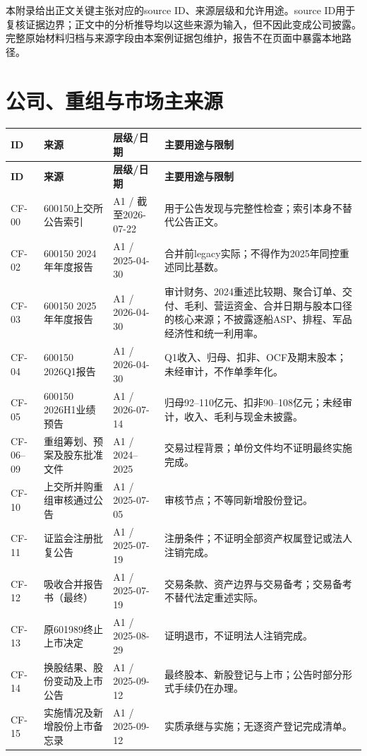 本附录给出正文关键主张对应的source ID、来源层级和允许用途。source ID用于复核证据边界；正文中的分析推导均以这些来源为输入，但不因此变成公司披露。完整原始材料归档与来源字段由本案例证据包维护，报告不在页面中暴露本地路径。

\section{公司、重组与市场主来源}

\small
\begin{longtable}{L{1.6cm} L{4.4cm} L{2.4cm} L{6.5cm}}
\toprule
\textbf{ID} & \textbf{来源} & \textbf{层级/日期} & \textbf{主要用途与限制} \\
\midrule
\endfirsthead
\toprule
\textbf{ID} & \textbf{来源} & \textbf{层级/日期} & \textbf{主要用途与限制} \\
\midrule
\endhead
CF-00 & 600150上交所公告索引 & A1 / 截至2026-07-22 & 用于公告发现与完整性检查；索引本身不替代公告正文。 \\
CF-02 & 600150 2024年年度报告 & A1 / 2025-04-30 & 合并前legacy实际；不得作为2025年同控重述同比基数。 \\
CF-03 & 600150 2025年年度报告 & A1 / 2026-04-30 & 审计财务、2024重述比较期、聚合订单、交付、毛利、营运资金、合并日期与股本口径的核心来源；不披露逐船ASP、排程、军品经济性和统一利用率。 \\
CF-04 & 600150 2026Q1报告 & A1 / 2026-04-30 & Q1收入、归母、扣非、OCF及期末股本；未经审计，不作单季年化。 \\
CF-05 & 600150 2026H1业绩预告 & A1 / 2026-07-14 & 归母92--110亿元、扣非90--108亿元；未经审计，收入、毛利与现金未披露。 \\
CF-06--09 & 重组筹划、预案及股东批准文件 & A1 / 2024--2025 & 交易过程背景；单份文件均不证明最终实施完成。 \\
CF-10 & 上交所并购重组审核通过公告 & A1 / 2025-07-05 & 审核节点；不等同新增股份登记。 \\
CF-11 & 证监会注册批复公告 & A1 / 2025-07-19 & 注册条件；不证明全部资产权属登记或法人注销完成。 \\
CF-12 & 吸收合并报告书（最终） & A1 / 2025-07-19 & 交易条款、资产边界与交易备考；交易备考不替代法定重述实际。 \\
CF-13 & 原601989终止上市决定 & A1 / 2025-08-29 & 证明退市，不证明法人注销完成。 \\
CF-14 & 换股结果、股份变动及上市公告 & A1 / 2025-09-12 & 最终股本、新股登记与上市；公告时部分形式手续仍在办理。 \\
CF-15 & 实施情况及新增股份上市备忘录 & A1 / 2025-09-12 & 实质承继与实施；无逐资产登记完成清单。 \\

\end{longtable}
